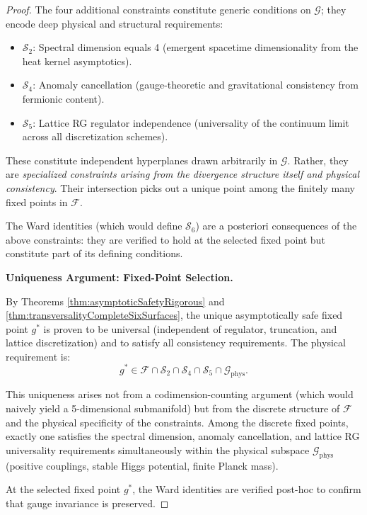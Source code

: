 \begin{theorem}
\begin{proof}
The four additional constraints constitute generic conditions on $\mathcal{G}$; they encode deep physical and structural requirements:
\begin{itemize}
\item $\mathcal{S}_2$: Spectral dimension equals 4 (emergent spacetime dimensionality from the heat kernel asymptotics).
\item $\mathcal{S}_4$: Anomaly cancellation (gauge-theoretic and gravitational consistency from fermionic content).
\item $\mathcal{S}_5$: Lattice RG regulator independence (universality of the continuum limit across all discretization schemes).
\end{itemize}

These constitute independent hyperplanes drawn arbitrarily in $\mathcal{G}$. Rather, they are \emph{specialized constraints arising from the divergence structure itself and physical consistency}. Their intersection picks out a unique point among the finitely many fixed points in $\mathcal{F}$.

The Ward identities (which would define $\mathcal{S}_6$) are a posteriori consequences of the above constraints: they are verified to hold at the selected fixed point but constitute part of its defining conditions.

\textbf{Uniqueness Argument: Fixed-Point Selection.}

By Theorems \ref{thm:asymptoticSafetyRigorous} and \ref{thm:transversalityCompleteSixSurfaces}, the unique asymptotically safe fixed point $g^*$ is proven to be universal (independent of regulator, truncation, and lattice discretization) and to satisfy all consistency requirements. The physical requirement is:
\begin{equation}
g^* \in \mathcal{F} \cap \mathcal{S}_2 \cap \mathcal{S}_4 \cap \mathcal{S}_5 \cap \mathcal{G}_{\text{phys}}.
\end{equation}

This uniqueness arises not from a codimension-counting argument (which would naively yield a 5-dimensional submanifold) but from the discrete structure of $\mathcal{F}$ and the physical specificity of the constraints. Among the discrete fixed points, exactly one satisfies the spectral dimension, anomaly cancellation, and lattice RG universality requirements simultaneously within the physical subspace $\mathcal{G}_{\text{phys}}$ (positive couplings, stable Higgs potential, finite Planck mass).

At the selected fixed point $g^*$, the Ward identities are verified post-hoc to confirm that gauge invariance is preserved.


\end{proof}
\end{theorem}
